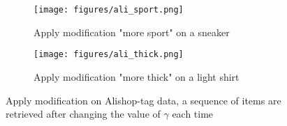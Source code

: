 \begin{figure}[ht]
\centering
\begin{subfigure}[b]{0.45\textwidth}
   \texttt{[image: figures/ali\_sport.png]}
   \caption{Apply modification "more sport" on a sneaker}
   \label{fig:ali_sport}
\end{subfigure}


\begin{subfigure}[b]{0.45\textwidth}
   \texttt{[image: figures/ali\_thick.png]}
   \caption{Apply modification "more thick" on a light shirt}
   \label{fig:ali_thick}
\end{subfigure}
\caption{Apply modification on Alishop-tag data, a sequence of items are retrieved after changing the value of $\gamma$ each time}
\label{fig:ali_visual}
\end{figure}